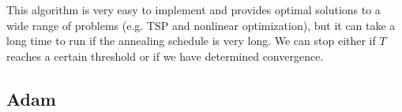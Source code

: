 \documentclass{article}
\begin{document}
    This algorithm is very easy to implement and provides optimal solutions to a wide range of problems (e.g. TSP and nonlinear optimization), but it can take a long time to run if the annealing schedule is very long. We can stop either if $T$ reaches a certain threshold or if we have determined convergence. 

  \subsection{Adam}
\end{document}
